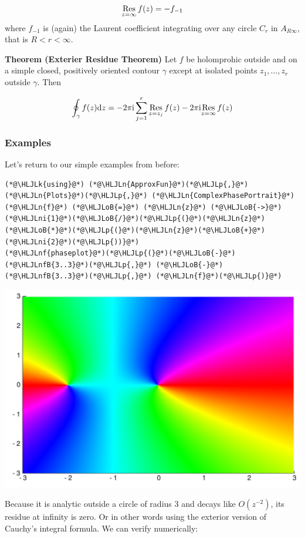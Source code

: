 \documentclass[12pt,a4paper]{article}
\newcommand{\HLJLk}[1]{\textcolor[RGB]{148,91,176}{\textbf{#1}}}
\newcommand{\HLJLn}[1]{#1}
\newcommand{\HLJLnf}[1]{\textcolor[RGB]{66,102,213}{#1}}
\newcommand{\HLJLnfB}[1]{\textcolor[RGB]{59,151,46}{#1}}
\newcommand{\HLJLni}[1]{\textcolor[RGB]{59,151,46}{#1}}
\newcommand{\HLJLoB}[1]{\textcolor[RGB]{102,102,102}{\textbf{#1}}}
\newcommand{\HLJLp}[1]{#1}
\def\D{ {\rm d} }
\def\I{ {\rm i} }
\def\Res_#1{\underset{#1}{\rm Res}\,}
\def\dz{\D z}
\begin{document}
\[
{\underset{z = \infty}{\rm Res}} \, f(z) = -f_{-1}
\]
where $f_{-1}$ is (again) the Laurent coefficient integrating over any circle $C_r$ in $A_{R\infty}$, that is $R < r < \infty$.

\textbf{Theorem (Exterier Residue Theorem)} Let $f$ be holomprohic outside and on a simple closed, positively oriented contour  $\gamma$ except at isolated points $z_1, \ldots, z_r$ outside $\gamma$. Then

\[
\oint_\gamma f(z) \dz = -2 \pi \I \sum_{j=1}^r {\underset{z = z_j}{\rm Res}}\, f(z) - 2 \pi \I \Res_{z = \infty} f(z) 
\]
\subsubsection{Examples}
Let's return to our simple examples from before:


\begin{lstlisting}
(*@\HLJLk{using}@*) (*@\HLJLn{ApproxFun}@*)(*@\HLJLp{,}@*) (*@\HLJLn{Plots}@*)(*@\HLJLp{,}@*) (*@\HLJLn{ComplexPhasePortrait}@*)
(*@\HLJLn{f}@*) (*@\HLJLoB{=}@*) (*@\HLJLn{z}@*) (*@\HLJLoB{->}@*) (*@\HLJLni{1}@*)(*@\HLJLoB{/}@*)(*@\HLJLp{(}@*)(*@\HLJLn{z}@*)(*@\HLJLoB{*}@*)(*@\HLJLp{(}@*)(*@\HLJLn{z}@*)(*@\HLJLoB{+}@*)(*@\HLJLni{2}@*)(*@\HLJLp{))}@*)
(*@\HLJLnf{phaseplot}@*)(*@\HLJLp{(}@*)(*@\HLJLoB{-}@*)(*@\HLJLnfB{3..3}@*)(*@\HLJLp{,}@*) (*@\HLJLoB{-}@*)(*@\HLJLnfB{3..3}@*)(*@\HLJLp{,}@*) (*@\HLJLn{f}@*)(*@\HLJLp{)}@*)
\end{lstlisting}

\includegraphics[width=\linewidth]{figures/Lecture4_4_1.pdf}

Because it is analytic outside a circle of radius 3 and decays like $O(z^{-2})$, its residue at infinity is zero.  Or in other words using the exterior version of Cauchy's integral formula. We can verify numerically:
\end{document}
